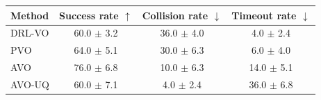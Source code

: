\begin{tabular}{lccc}
\toprule
Method & Success rate $\uparrow$ & Collision rate $\downarrow$ & Timeout rate $\downarrow$ \\
\midrule
DRL-VO & 60.0 $\pm$ 3.2 & 36.0 $\pm$ 4.0 & 4.0 $\pm$ 2.4 \\
PVO & 64.0 $\pm$ 5.1 & 30.0 $\pm$ 6.3 & 6.0 $\pm$ 4.0 \\
AVO & 76.0 $\pm$ 6.8 & 10.0 $\pm$ 6.3 & 14.0 $\pm$ 5.1 \\
AVO-UQ & 60.0 $\pm$ 7.1 & 4.0 $\pm$ 2.4 & 36.0 $\pm$ 6.8 \\
\bottomrule
\end{tabular}
